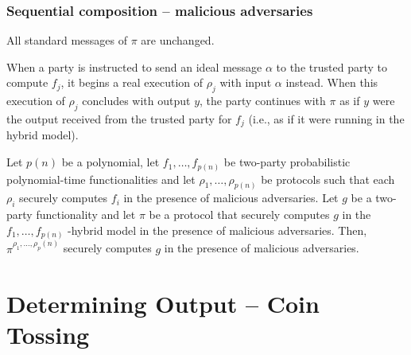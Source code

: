 \documentclass{beamer}
\begin{document}
    \begin{frame}
        \frametitle{Sequential composition – malicious adversaries}
        \begin{definition}
            

            All standard messages of $\pi$ are unchanged. 

            When a party is instructed to send an ideal message $\alpha$ to the trusted party to compute $f_{j}$, it begins a real execution of $\rho_{j}$ with input $\alpha$ instead. When this execution of $\rho_{j}$ concludes with output $y$, the party continues with $\pi$ as if $y$ were the output received from the trusted party for $f_{j}$ (i.e., as if it were running in the hybrid model).

            
        \end{definition}
        \begin{theorem}
            Let $p(n)$ be a polynomial, let $f_{1}, \ldots, f_{p(n)}$ be two-party probabilistic polynomial-time functionalities and let $\rho_{1}, \ldots, \rho_{p(n)}$ be protocols such that each $\rho_{i}$ securely computes $f_{i}$ in the presence of malicious adversaries. Let $g$ be a two-party functionality and let $\pi$ be a protocol that securely computes $g$ in the $f_{1}, \ldots, f_{p(n)}$ -hybrid model in the presence of malicious adversaries. Then, $\pi^{\rho_{1}, \ldots, \rho_{p}(n)}$ securely computes $g$ in the presence of malicious adversaries.

        \end{theorem}
    
        
    
    \end{frame}

    \section{Determining Output – Coin Tossing}

    \sectionpage
\end{document}
